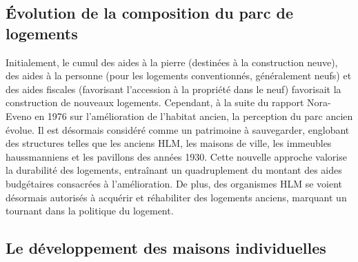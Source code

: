 \documentclass[a4paper, 12pt]{report}
\begin{document}
\subsection{Évolution de la composition du parc de logements}

Initialement, le cumul des aides à la pierre (destinées à la construction neuve), des aides à la personne (pour les logements conventionnés, généralement neufs) et des aides fiscales (favorisant l'accession à la propriété dans le neuf) favorisait la construction de nouveaux logements. Cependant, à la suite du rapport Nora-Eveno en 1976 sur l'amélioration de l'habitat ancien, la perception du parc ancien évolue. Il est désormais considéré comme un patrimoine à sauvegarder, englobant des structures telles que les anciens HLM, les maisons de ville, les immeubles haussmanniens et les pavillons des années 1930. Cette nouvelle approche valorise la durabilité des logements, entraînant un quadruplement du montant des aides budgétaires consacrées à l'amélioration. De plus, des organismes HLM se voient désormais autorisés à acquérir et réhabiliter des logements anciens, marquant un tournant dans la politique du logement.

\subsection{Le développement des maisons individuelles}
\end{document}
